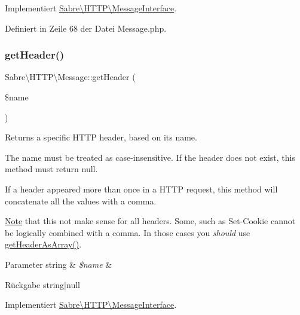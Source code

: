 Implementiert \mbox{\hyperlink{interface_sabre_1_1_h_t_t_p_1_1_message_interface_a2e5fd4e2e19115840ba859a096666d9d}{Sabre\textbackslash{}\+H\+T\+T\+P\textbackslash{}\+Message\+Interface}}.



Definiert in Zeile 68 der Datei Message.\+php.

\mbox{\label{class_sabre_1_1_h_t_t_p_1_1_message_aea639d7fd0ca29dadee89eba3f2e3b8d}} 
\subsubsection{\texorpdfstring{get\+Header()}{getHeader()}}
{\footnotesize\ttfamily Sabre\textbackslash{}\+H\+T\+T\+P\textbackslash{}\+Message\+::get\+Header (\begin{DoxyParamCaption}\item[{}]{\$name }\end{DoxyParamCaption})}

Returns a specific H\+T\+TP header, based on it\textquotesingle{}s name.

The name must be treated as case-\/insensitive. If the header does not exist, this method must return null.

If a header appeared more than once in a H\+T\+TP request, this method will concatenate all the values with a comma.

\mbox{\hyperlink{class_note}{Note}} that this not make sense for all headers. Some, such as {\ttfamily Set-\/\+Cookie} cannot be logically combined with a comma. In those cases you {\itshape should} use \mbox{\hyperlink{class_sabre_1_1_h_t_t_p_1_1_message_a15a679683a423df9878d08e208433448}{get\+Header\+As\+Array()}}.


\begin{DoxyParams}[1]{Parameter}
string & {\em \$name} & \\
\hline
\end{DoxyParams}
\begin{DoxyReturn}{Rückgabe}
string$\vert$null 
\end{DoxyReturn}


Implementiert \mbox{\hyperlink{interface_sabre_1_1_h_t_t_p_1_1_message_interface_ac83dfeddea2be33e620b32b07ae057c5}{Sabre\textbackslash{}\+H\+T\+T\+P\textbackslash{}\+Message\+Interface}}.




